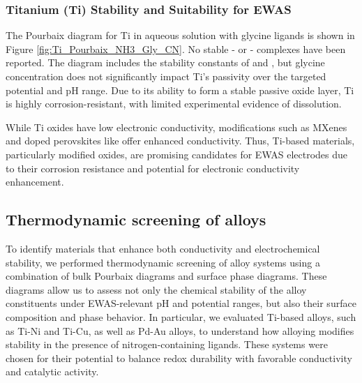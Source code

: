 \documentclass[journal=jacsat,manuscript=article]{achemso}
\begin{document}
\subsubsection{Titanium (Ti) Stability and Suitability for EWAS}
The Pourbaix diagram for Ti in aqueous solution with glycine ligands is shown in Figure \ref{fig:Ti_Pourbaix_NH3_Gly_CN}. No stable - or - complexes have been reported\cite{Griffith1962CyanideMetals, Nicholls1980ComplexTitanium}. The diagram includes the stability constants of \ce{[Ti(Gly)^-]} and \ce{[Ti(Gly)_2^+]}, but glycine concentration does not significantly impact Ti's passivity over the targeted potential and pH range. Due to its ability to form a stable passive oxide layer\cite{Kiss1991CriticalGlycine, PourbaixAtlasSolutions}, Ti is highly corrosion-resistant, with limited experimental evidence of dissolution\cite{Schmidt2009AqueousVoltammetry, Ziemniak1993SolubilityTemperatures, Knauss2001TiIV300C, Schmidt2006DissolutionEffect, Pocsi1988ComplexAcid}.

While Ti oxides have low electronic conductivity, modifications such as MXenes\cite{Gardon2013ImprovedSpray, Naguib2012Two-DimensionalCarbides, Hui2022VacancyBatteries} and doped perovskites like \cite{Sokolov2024ComputationalTitanate} offer enhanced conductivity. Thus, Ti-based materials, particularly modified oxides, are promising candidates for EWAS electrodes due to their corrosion resistance and potential for electronic conductivity enhancement.

\subsection{Thermodynamic screening of alloys} \label{sec:alloy_screening}

To identify materials that enhance both conductivity and electrochemical stability, we performed thermodynamic screening of alloy systems using a combination of bulk Pourbaix diagrams and surface phase diagrams. These diagrams allow us to assess not only the chemical stability of the alloy constituents under EWAS-relevant pH and potential ranges, but also their surface composition and phase behavior. In particular, we evaluated Ti-based alloys, such as Ti-Ni and Ti-Cu, as well as Pd-Au alloys, to understand how alloying modifies stability in the presence of nitrogen-containing ligands. These systems were chosen for their potential to balance redox durability with favorable conductivity and catalytic activity.
\end{document}
